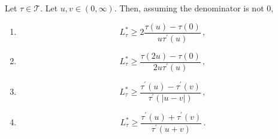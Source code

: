 \documentclass{article}
\newcommand*{\mc}[1]{\mathcal{#1}}
\newcommand{\Rpp}{(0, \infty)} %
\newcommand{\pr}{^\prime}
\newcommand{\equationFullstop}{\, .}
\newcommand{\eqfs}{\equationFullstop}
\newcommand{\equationComma}{\, ,}
\newcommand{\eqcm}{\equationComma}
\newcommand{\tran}{\tau}
\newcommand{\Tran}{\mc{T}}
\newcommand{\dtran}{\tran\pr}
\newcommand{\ctransymbol}{L}
\newcommand{\ctranobest}[1]{\ctransymbol_{#1}^{*}}
\newcommand{\ctranbest}{\ctranobest{\tran}}
\begin{document}
\begin{proposition}\label{lmm:constLowerBounds}
	Let $\tran\in\Tran$. Let $u,v\in\Rpp$. Then, assuming the denominator is not 0, 
	\begin{enumerate}[label=(\roman*)]
		\item \label{lmm:constLowerBounds:2tau}
		\begin{equation}
			\ctranbest \geq 2\frac{\tran(u) -\tran(0)}{u \dtran(u)}\eqcm
		\end{equation}
		\item \label{lmm:constLowerBounds:2u}
		\begin{equation}
			\ctranbest \geq \frac{\tran(2u) -\tran(0)}{2u \dtran(u)}\eqcm
		\end{equation}
		\item \label{lmm:constLowerBounds:subadd}
		\begin{equation}
			\ctranbest \geq \frac{\dtran(u) - \dtran(v)}{\dtran(|u-v|)}\eqcm
		\end{equation}
		\item \label{lmm:constLowerBounds:supadd}
		\begin{equation}
			\ctranbest \geq \frac{\dtran(u) + \dtran(v)}{\dtran(u+v)}\eqfs
		\end{equation}
	\end{enumerate}
\end{proposition}
%
%
\end{document}
